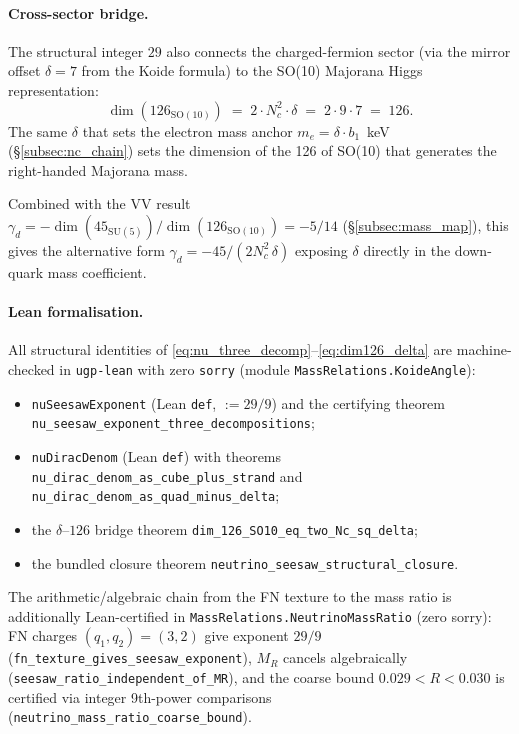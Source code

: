 \documentclass[11pt]{article}
\theoremstyle{remark}
\begin{document}
\paragraph{Cross-sector bridge.}
The structural integer $29$ also connects the charged-fermion sector (via the mirror offset $\delta = 7$ from the Koide formula) to the SO(10) Majorana Higgs representation:
\begin{equation}
\dim(126_{\mathrm{SO}(10)}) \;=\; 2 \cdot N_c^2 \cdot \delta \;=\; 2 \cdot 9 \cdot 7 \;=\; 126.
\label{eq:dim126_delta}
\end{equation}
The same $\delta$ that sets the electron mass anchor $m_e = \delta \cdot b_1$~keV (\S\ref{subsec:nc_chain}) sets the dimension of the 126 of SO(10) that generates the right-handed Majorana mass.

\smallskip
Combined with the VV result $\gamma_d = -\dim(45_{\mathrm{SU}(5)})/\dim(126_{\mathrm{SO}(10)}) = -5/14$ (\S\ref{subsec:mass_map}), this gives the alternative form $\gamma_d = -45/(2N_c^2\,\delta)$ exposing $\delta$ directly in the down-quark mass coefficient.

\paragraph{Lean formalisation.}
All structural identities of \eqref{eq:nu_three_decomp}--\eqref{eq:dim126_delta}
are machine-checked in \texttt{ugp-lean} with zero \texttt{sorry}
(module \texttt{MassRelations.KoideAngle}):
\begin{itemize}[leftmargin=1.2em,itemsep=0.1em,topsep=0.2em]
  \item \texttt{nuSeesawExponent} (Lean \texttt{def}, $:= 29/9$) and the
    certifying theorem \texttt{nu\_seesaw\_exponent\_three\_\allowbreak decompositions};
  \item \texttt{nuDiracDenom} (Lean \texttt{def}) with theorems
    \texttt{nu\_dirac\_denom\_as\_cube\_plus\_strand} and
    \texttt{nu\_dirac\_denom\_as\_quad\_minus\_delta};
  \item the $\delta$--$126$ bridge theorem
    \texttt{dim\_126\_SO10\_eq\_two\_Nc\_sq\_delta};
  \item the bundled closure theorem
    \texttt{neutrino\_seesaw\_structural\_closure}.
\end{itemize}
The arithmetic/algebraic chain from the FN texture to the mass ratio is additionally Lean-certified in \texttt{MassRelations.NeutrinoMassRatio} (zero sorry): FN charges $(q_1,q_2)=(3,2)$ give exponent $29/9$ (\texttt{fn\_texture\_gives\_seesaw\_exponent}), $M_R$ cancels algebraically (\texttt{seesaw\_ratio\_independent\_of\_MR}), and the coarse bound $0.029 < R < 0.030$ is certified via integer 9th-power comparisons (\texttt{neutrino\_mass\_ratio\_coarse\_bound}).
\end{document}
